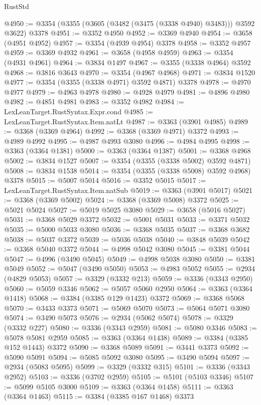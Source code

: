 \begin{lexlean}{RustStd}
\begin{coremodule}
@4950 := @3354 (@3355 (@3605 (@3482 (@3475 (@3338 @4940) @3483))) @3592 @3622) @3378
@4951 := @3352 @4950
@4952 := @3369 @4940
@4954 := @3658 (@4951 @4952)
@4957 := @3354 (@4939 @4954) @3378
@4958 := @3352 @4957
@4959 := @3369 @4932
@4961 := @3658 (@4958 @4959)
@4963 := @3354 (@4931 @4961)
@4964 := @3834 @1497
@4967 := @3355 (@3338 @4964) @3592
@4968 := @3816 @3643
@4970 := @3354 (@4967 @4968)
@4971 := @3834 @1520
@4977 := @3354 (@3355 (@3338 @4971) @3592 @4871) @3378
@4978 := @4970 @4977
@4979 := @4963 @4978
@4980 := @4928 @4979
@4981 := @4896 @4980
@4982 := @4851 @4981
@4983 := @3352 @4982
@4984 := LexLeanTarget.RustSyntax.Expr.cond
@4985 := LexLeanTarget.RustSyntax.Item.natLt
@4987 := @3363 (@3901 @4985)
@4989 := @3368 (@3369 @4964)
@4992 := @3368 (@3369 @4971) @3372
@4993 := @4989 @4992
@4995 := @4987 @4993 @3080
@4996 := @4984 @4995
@4998 := @3363 (@3364 @1381)
@5000 := @3363 (@3364 @1387)
@5001 := @3368 @4968
@5002 := @3834 @1527
@5007 := @3354 (@3355 (@3338 @5002) @3592 @4871)
@5008 := @3834 @1538
@5014 := @3354 (@3355 (@3338 @5008) @3592 @4968) @3378
@5015 := @5007 @5014
@5016 := @3352 @5015
@5017 := LexLeanTarget.RustSyntax.Item.natSub
@5019 := @3363 (@3901 @5017)
@5021 := @3368 (@3369 @5002)
@5024 := @3368 (@3369 @5008) @3372
@5025 := @5021 @5024
@5027 := @5019 @5025 @3080
@5029 := @3658 (@5016 @5027)
@5031 := @3368 @5029 @3372
@5032 := @5001 @5031
@5033 := @3371 @5032
@5035 := @5000 @5033 @3080
@5036 := @3368 @5035
@5037 := @3368 @3682
@5038 := @5037 @3372
@5039 := @5036 @5038
@5040 := @3848 @5039
@5042 := @3368 @5040 @3372
@5044 := @4998 @5042 @3080
@5045 := @3381 @5044
@5047 := @4996 (@3490 @5045)
@5049 := @4998 @5038 @3080
@5050 := @3381 @5049
@5052 := @5047 (@3490 @5050)
@5053 := @4983 @5052
@5055 := @2934 (@4829 @5053)
@5057 := @3329 (@3332 @213)
@5059 := @3336 (@3343 @2950)
@5060 := @5059 @3346
@5062 := @5057 @5060 @2950
@5064 := @3363 (@3364 @1418)
@5068 := @3384 (@3385 @129 @1423) @3372
@5069 := @3368 @5068
@5070 := @3433 @3373
@5071 := @5069 @5070
@5073 := @5064 @5071 @3080
@5074 := @3490 @5073
@5076 := @2934 (@5062 @5074)
@5078 := @3329 (@3332 @227)
@5080 := @3336 (@3343 @2959)
@5081 := @5080 @3346
@5083 := @5078 @5081 @2959
@5085 := @3363 (@3364 @1438)
@5089 := @3384 (@3385 @152 @1443) @3372
@5090 := @3368 @5089
@5091 := @3441 @3373
@5092 := @5090 @5091
@5094 := @5085 @5092 @3080
@5095 := @3490 @5094
@5097 := @2934 (@5083 @5095)
@5099 := @3329 (@3332 @315)
@5101 := @3336 (@3343 @2952)
@5103 := @3336 (@3702 @2959)
@5105 := @5101 (@5103 @3346)
@5107 := @5099 @5105 @3000
@5109 := @3363 (@3364 @1458)
@5111 := @3363 (@3364 @1463)
@5115 := @3384 (@3385 @167 @1468) @3373

\end{coremodule}
\end{lexlean}
